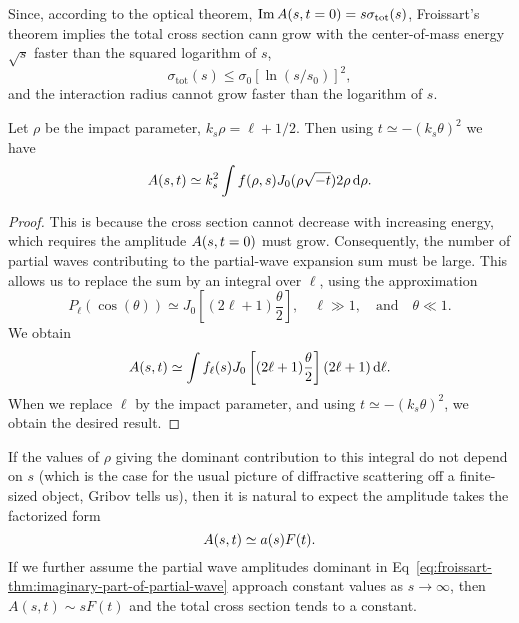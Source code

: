 \begin{corollary}
Since, according to the optical theorem, $\operatorname{Im}A(s,t=0)=s\sigma_{\text{tot}}(s)$,
Froissart's theorem implies the total cross section cann grow with the
center-of-mass energy $\sqrt{s}$ faster than the squared logarithm of
$s$,
\begin{equation}
\sigma_{\text{tot}}(s)\leq\sigma_{0}[\ln(s/s_{0})]^{2},
\end{equation}
and the interaction radius cannot grow faster than the logarithm of $s$.
\end{corollary}

\begin{corollary}
Let $\rho$ be the impact parameter, $k_{s}\rho = \ell+1/2$.
Then using
$t\simeq-(k_{s}\theta)^{2}$ we have
\begin{equation}
A(s,t)\simeq k_{s}^{2}\int f(\rho,s)J_{0}(\rho\sqrt{-t})2\rho\,\mathrm{d}\rho.
\end{equation}
\end{corollary}

\begin{proof}
This is because the cross section cannot decrease with increasing
energy, which requires the amplitude $A(s,t=0)$ must grow.
Consequently, the number of partial waves contributing to the
partial-wave expansion sum must be large. This allows us to replace the
sum by an integral over $\ell$, using the approximation
\begin{equation}
P_{\ell}(\cos(\theta))\simeq J_{0}\left[(2\ell+1)\frac{\theta}{2}\right],\quad\ell\gg1,\quad\mbox{and}\quad\theta\ll1.
\end{equation}
We obtain
\begin{equation}
A(s,t)\simeq\int f_{\ell}(s)J_{0}\left[(2\ell+1)\frac{\theta}{2}\right](2\ell+1)\,\mathrm{d}\ell.
\end{equation}
When we replace $\ell$ by the impact parameter, and using $t\simeq-(k_{s}\theta)^{2}$,
we obtain the desired result.
\end{proof}

\M[1]
If the values of $\rho$ giving the dominant contribution to this
integral do not depend on $s$ (which is the case for the usual picture
of diffractive scattering off a finite-sized object, Gribov tells us),
then it is natural to expect the amplitude takes the factorized form
\begin{equation}
A(s,t)\simeq a(s)F(t).
\end{equation}
If we further assume the partial wave amplitudes dominant in
Eq~\eqref{eq:froissart-thm:imaginary-part-of-partial-wave}
approach constant values as $s\to\infty$, then $A(s,t)\sim sF(t)$ and
the total cross section tends to a constant.
